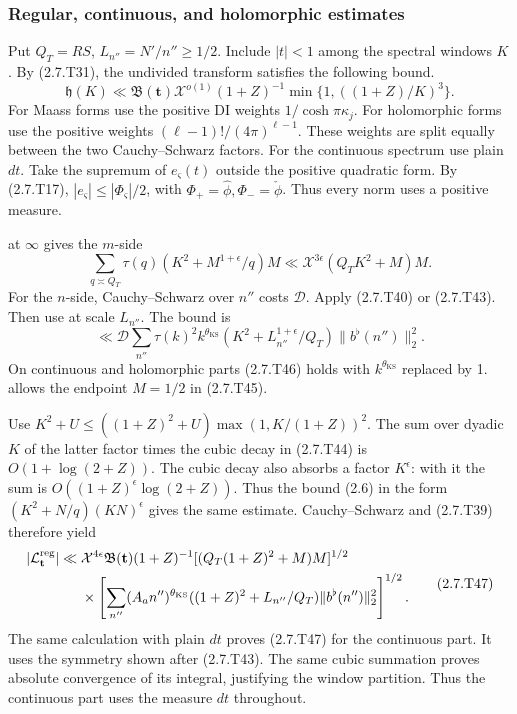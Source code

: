 \subsubsection{Regular, continuous, and holomorphic estimates}

Put $Q_T=RS$, $L_{n''}=N'/n''\ge1/2$. Include $|t|<1$ among the spectral windows $K$. By (2.7.T31), the undivided transform satisfies the following bound.
\[
\mathfrak h(K)\ll\mathfrak B(\mathbf t)\mathcal X^{o(1)}
 (1+Z)^{-1}\min\{1,((1+Z)/K)^3\}.
\tag{2.7.T44}\label{p1:eq:2.7.T44}
\]
For Maass forms use the positive DI weights $1/\cosh\pi\kappa_j$. For holomorphic forms use the positive weights $(\ell-1)!/(4\pi)^{\ell-1}$. These weights are split equally
between the two Cauchy--Schwarz factors. For the continuous spectrum use plain $dt$. Take the supremum of $e_\varsigma(t)$ outside the positive quadratic form.
By (2.7.T17), $|e_\varsigma|\le|\Phi_\varsigma|/2$, with
$\Phi_+=\widehat\phi,\Phi_-=\check\phi$. Thus every norm uses a
positive measure.

\cite[Theorem~2]{DI82} at $\infty$ gives the $m$-side
\[
\sum_{q\asymp Q_T}\tau(q)(K^2+M^{1+\epsilon}/q)M
 \ll\mathcal X^{3\epsilon}(Q_TK^2+M)M.
\tag{2.7.T45}\label{p1:eq:2.7.T45}
\]
For the $n$-side, Cauchy--Schwarz over $n''$ costs $\mathcal D$. Apply (2.7.T40) or (2.7.T43). Then use \cite[Theorem~2]{DI82} at scale $L_{n''}$. The bound is
\[
\ll\mathcal D\sum_{n''}\tau(k)^2k^{\theta_{\mathrm{KS}}}
             (K^2+L_{n''}^{1+\epsilon}/Q_T)\|b^\flat(n'')\|_2^2.
\tag{2.7.T46}\label{p1:eq:2.7.T46}
\]
On continuous and holomorphic parts (2.7.T46) holds with $k^{\theta_{\mathrm{KS}}}$
replaced by 1. \cite[Theorem~2]{DI82} allows the endpoint $M=1/2$
in (2.7.T45).

Use $K^2+U\le((1+Z)^2+U)\max(1,K/(1+Z))^2$.
The sum over dyadic $K$ of the latter factor times the cubic
decay in (2.7.T44) is $O(1+\log(2+Z))$. The cubic decay also absorbs a factor $K^\epsilon$: with it the sum is $O((1+Z)^\epsilon\log(2+Z))$. Thus the bound (2.6) in the form $(K^2+N/q)(KN)^\epsilon$ gives the same estimate. Cauchy--Schwarz and
(2.7.T39) therefore yield
\[
\begin{aligned}
|\mathcal L_{\mathbf t}^{\rm reg}|
\ll{}&\mathcal X^{4\epsilon}\mathfrak B(\mathbf t)(1+Z)^{-1}
 [(Q_T(1+Z)^2+M)M]^{1/2}\\
&\times\left[\sum_{n''}(A_an'')^{\theta_{\mathrm{KS}}}
 ((1+Z)^2+L_{n''}/Q_T)\|b^\flat(n'')\|_2^2\right]^{1/2}.
\end{aligned}
\tag{2.7.T47}\label{p1:eq:2.7.T47}
\]
The same calculation with plain $dt$ proves (2.7.T47) for
the continuous part. It uses the symmetry shown after
(2.7.T43). The same cubic summation proves absolute convergence
of its integral, justifying the window partition. Thus the
continuous part uses the measure $dt$ throughout.

